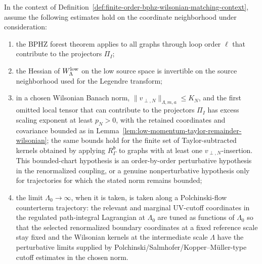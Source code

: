 \begin{hypothesis}
\label{hyp:finite-order-bphz-wilsonian-matching-estimates}
In the context of
Definition~\ref{def:finite-order-bphz-wilsonian-matching-context}, assume the
following estimates hold on the coordinate neighborhood under consideration:
\begin{enumerate}[label=(\alph*)]
  \item the BPHZ forest theorem applies to all graphs through loop order
  \(\ell\) that contribute to the projectors \(\Pi_I\);
  \item the Hessian of \(W_\Lambda^{\rm low}\) on the low source space is
  invertible on the source neighborhood used for the Legendre transform;
  \item in a chosen Wilsonian Banach norm,
  \(\|v_{\perp,N}\|_{\Lambda,m,a}\leq K_N\), and the first omitted local
  tensor that can contribute to the projectors \(\Pi_I\) has excess scaling
  exponent at least \(p_N>0\), with the retained coordinates and covariance
  bounded as in Lemma~\ref{lem:low-momentum-taylor-remainder-wilsonian};
  the same bounds hold for the finite set of Taylor-subtracted kernels
  obtained by applying \(R_\Gamma^{\mathfrak b}\) to graphs with at least one
  \(v_{\perp,N}\)-insertion.
  This bounded-chart hypothesis is an order-by-order perturbative hypothesis
  in the renormalized coupling, or a genuine nonperturbative hypothesis only
  for trajectories for which the stated norm remains bounded;
  \item the limit \(\Lambda_0\to\infty\), when it is taken, is taken along a
  Polchinski-flow counterterm trajectory: the relevant and marginal
  UV-cutoff coordinates in the regulated path-integral Lagrangian at
  \(\Lambda_0\) are tuned as functions of \(\Lambda_0\) so that the selected
  renormalized boundary coordinates at a fixed reference scale stay fixed and
  the Wilsonian kernels at the intermediate scale \(\Lambda\) have the
  perturbative limits supplied by Polchinski/Salmhofer/Kopper--M\"uller-type
  cutoff estimates in the chosen norm.
\end{enumerate}
\end{hypothesis}

